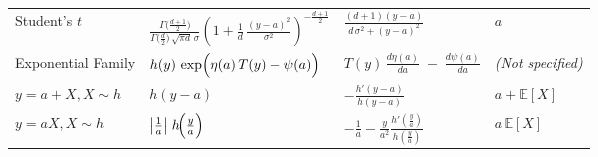 \begin{table}[ht]
{\begin{tabular}{l p{5.5cm} p{3.8cm} p{3.8cm}}
        Student's \(t\)
        & \( 
        \frac{\Gamma\!\bigl(\tfrac{d + 1}{2}\bigr)}{\Gamma\!\bigl(\tfrac{d}{2}\bigr)\,\sqrt{\pi d}\,\sigma}
        \left(1 + \frac{1}{d} \,\frac{(y - a)^2}{\sigma^2}\right)^{-\tfrac{d + 1}{2}}
        \) 
        & \( \frac{(d+1)(y-a)}{d\,\sigma^2 + (y-a)^2} \)
        & \( a \) 
        \\ 

        Exponential Family
        & \( h(y)\,\exp\Bigl(\eta(a)\,T(y) - \psi(a)\Bigr) \)
        & \( T(y)\,\frac{d\eta(a)}{da} \;-\; \frac{d\psi(a)}{da} \)
        & \textit{(Not specified)} 
        \\ 

        \( y = a + X, X \sim h \)
        & \( h(y - a) \)
        & \( -\frac{h'(y - a)}{h(y - a)} \)
        & \( a + \mathbb{E}[X] \) 
        \\ 

        \( y = a X, X \sim h \)
        & \( \bigl|\tfrac{1}{a}\bigr|\;h\!\Bigl(\tfrac{y}{a}\Bigr) \)
        & \( -\frac{1}{a} - \frac{y}{a^2} \frac{h'(\frac{y}{a})}{h(\frac{y}{a})} \)
        & \( a \,\mathbb{E}[X] \)
        \\ 
        \bottomrule
    \end{tabular}
    } %
\end{table}

